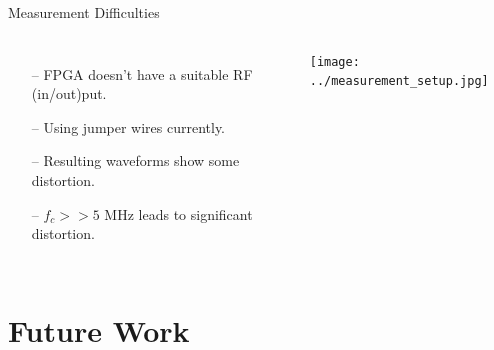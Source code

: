 \documentclass{beamer}
\begin{document}
\begin{frame}{Measurement Difficulties}
\vspace*{-5mm}
\begin{columns}
	\begin{itemize}
		\item[--]
			FPGA doesn't have a suitable RF (in/out)put.
		\item[--]
			Using jumper wires currently.
		\item[--]
			Resulting waveforms show some distortion.
		\item[--]
			$f_c>>5\textrm{ MHz}$ leads to significant distortion.
	\end{itemize}
    \texttt{[image: ../measurement\_setup.jpg]}

\end{columns}
\end{frame}

\section*{Future Work}
\end{document}
